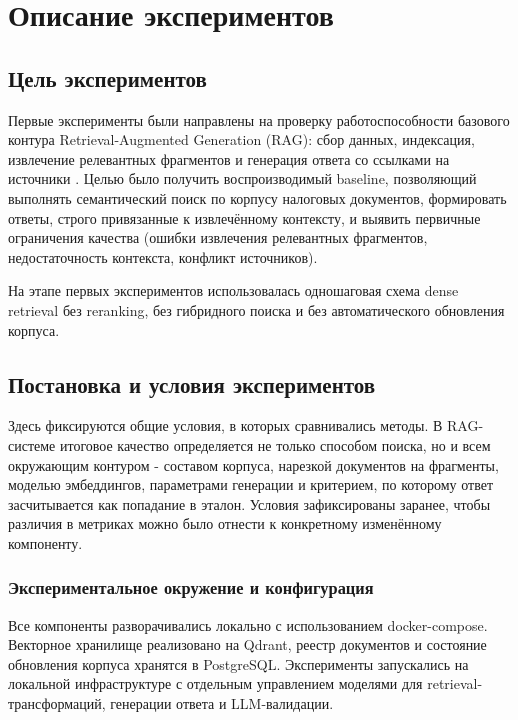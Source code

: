 \documentclass[a4paper,12pt]{article}
\begin{document}
\newpage
\section{Описание экспериментов}

\subsection{Цель экспериментов}

Первые эксперименты были направлены на проверку работоспособности базового контура Retrieval-Augmented Generation (RAG): сбор данных, индексация, извлечение релевантных фрагментов и генерация ответа со ссылками на источники \cite{lewis2020rag}. Целью было получить воспроизводимый baseline, позволяющий выполнять семантический поиск по корпусу налоговых документов, формировать ответы, строго привязанные к извлечённому контексту, и выявить первичные ограничения качества (ошибки извлечения релевантных фрагментов, недостаточность контекста, конфликт источников).

На этапе первых экспериментов использовалась одношаговая схема dense retrieval без reranking, без гибридного поиска и без автоматического обновления корпуса.

\subsection{Постановка и условия экспериментов}

Здесь фиксируются общие условия, в которых сравнивались методы. В RAG-системе итоговое качество определяется не только способом поиска, но и всем окружающим контуром - составом корпуса, нарезкой документов на фрагменты, моделью эмбеддингов, параметрами генерации и критерием, по которому ответ засчитывается как попадание в эталон. Условия зафиксированы заранее, чтобы различия в метриках можно было отнести к конкретному изменённому компоненту.

\subsubsection{Экспериментальное окружение и конфигурация}

Все компоненты разворачивались локально с использованием docker-compose. Векторное хранилище реализовано на Qdrant, реестр документов и состояние обновления корпуса хранятся в PostgreSQL. Эксперименты запускались на локальной инфраструктуре с отдельным управлением моделями для retrieval-трансформаций, генерации ответа и LLM-валидации.
\end{document}

